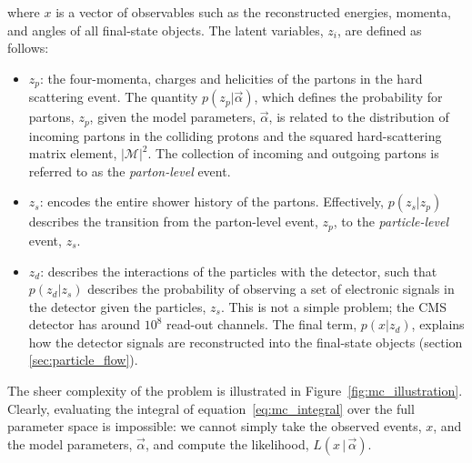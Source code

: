 \noindent
where $x$ is a vector of observables such as the reconstructed energies, momenta, and angles of all final-state objects. The latent variables, $z_i$, are defined as follows:
\begin{itemize}
    \item $z_p$: the four-momenta, charges and helicities of the partons in the hard scattering event. The quantity $p(z_p|\vec{\alpha})$, which defines the probability for partons, $z_p$, given the model parameters, $\vec{\alpha}$, is related to the distribution of incoming partons in the colliding protons and the squared hard-scattering matrix element, $|\mathcal{M}|^2$. The collection of incoming and outgoing partons is referred to as the \textit{parton-level} event.
    \item $z_s$: encodes the entire shower history of the partons. Effectively, $p(z_s|z_p)$ describes the transition from the parton-level event, $z_p$, to the \textit{particle-level} event, $z_s$.
    \item $z_d$: describes the interactions of the particles with the detector, such that $p(z_d|z_s)$ describes the probability of observing a set of electronic signals in the detector given the particles, $z_s$. This is not a simple problem; the CMS detector has around $10^8$ read-out channels. The final term, $p(x|z_d)$, explains how the detector signals are reconstructed into the final-state objects (section \ref{sec:particle_flow}).
\end{itemize} 

The sheer complexity of the problem is illustrated in Figure~\ref{fig:mc_illustration}. Clearly, evaluating the integral of equation~\ref{eq:mc_integral} over the full parameter space is impossible: we cannot simply take the observed events, $x$, and the model parameters, $\vec{\alpha}$, and compute the likelihood, $L(x\,|\,\vec{\alpha})$.

